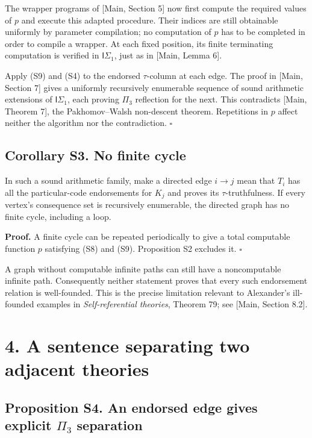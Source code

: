 \documentclass[
  11pt,
  letterpaper,
]{article}
\begin{document}
The wrapper programs of {[}Main, Section 5{]} now first compute the
required values of \(p\) and execute this adapted procedure. Their
indices are still obtainable uniformly by parameter compilation; no
computation of \(p\) has to be completed in order to compile a wrapper.
At each fixed position, its finite terminating computation is verified
in \(\mathsf I\Sigma_1\), just as in {[}Main, Lemma 6{]}.

Apply (S9) and (S4) to the endorsed \(\tau\)-column at each edge. The
proof in {[}Main, Section 7{]} gives a uniformly recursively enumerable
sequence of sound arithmetic extensions of \(\mathsf I\Sigma_1\), each
proving \(\Pi_3\) reflection for the next. This contradicts {[}Main,
Theorem 7{]}, the Pakhomov--Walsh non-descent theorem. Repetitions in
\(p\) affect neither the algorithm nor the contradiction.
\hfill\(\square\)

\subsection{Corollary S3. No finite
cycle}\label{corollary-s3.-no-finite-cycle}

In such a sound arithmetic family, make a directed edge \(i\to j\) mean
that \(T_i\) has all the particular-code endorsements for \(K_j\) and
proves its \(\tau\)-truthfulness. If every vertex's consequence set is
recursively enumerable, the directed graph has no finite cycle,
including a loop.

\textbf{Proof.} A finite cycle can be repeated periodically to give a
total computable function \(p\) satisfying (S8) and (S9). Proposition S2
excludes it. \hfill\(\square\)

A graph without computable infinite paths can still have a noncomputable
infinite path. Consequently neither statement proves that every such
endorsement relation is well-founded. This is the precise limitation
relevant to Alexander's ill-founded examples in \emph{Self-referential
theories}, Theorem 79; see {[}Main, Section 8.2{]}.

\section{4. A sentence separating two adjacent
theories}\label{a-sentence-separating-two-adjacent-theories}

\subsection{\texorpdfstring{Proposition S4. An endorsed edge gives
explicit \(\Pi_3\)
separation}{Proposition S4. An endorsed edge gives explicit \textbackslash Pi\_3 separation}}\label{proposition-s4.-an-endorsed-edge-gives-explicit-pi_3-separation}
\end{document}
